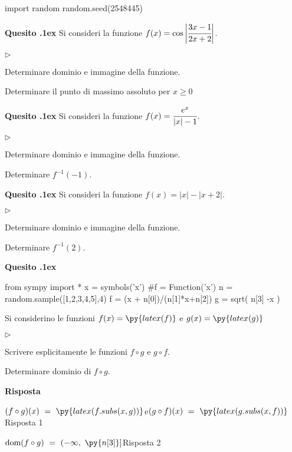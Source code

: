 \documentclass[11pt,twoside,a4paper]{article}
\newcommand{\mylabel}[1]{#1\hfill}
\renewenvironment{itemize}
  {\begin{list}{$\triangleright$}{%
   \setlength{\parskip}{0mm}
   \setlength{\topsep}{.4\baselineskip}
   \setlength{\rightmargin}{0mm}
   \setlength{\listparindent}{0mm}
   \setlength{\itemindent}{0mm}
   \setlength{\labelwidth}{2ex}
   \setlength{\itemsep}{.4\baselineskip}
   \setlength{\parsep}{0mm}
   \setlength{\partopsep}{0mm}
   \setlength{\labelsep}{1ex}
   \setlength{\leftmargin}{\labelwidth+\labelsep}
   \let\makelabel\mylabel}}{%
   \end{list}\vspace*{-1.3mm}}
\newcounter{quesito}
\newenvironment{question}{\bigskip\addtocounter{quesito}{1}\bigskip\bigskip\par\textbf{Quesito \thequesito.\kern1ex}}{\vspace{\parskip}}
\newenvironment{answer}{\par\textbf{Risposta\quad}}{\vspace{\parskip}}
\begin{document}
\begin{pycode}
import random
random.seed(2548445)
\end{pycode}

\begin{question}
Si consideri la funzione $f(x) = \cos \bigg|\cfrac{3x-1}{2x+2} \bigg|$.
\begin{itemize}
\item[1.] Determinare dominio e immagine della funzione.
\item[2.] Determinare il punto di massimo assoluto per $x \geq 0$
\end{itemize}
\end{question}

\begin{question}
Si consideri la funzione $f(x) = \cfrac{e^x}{\lvert x \rvert - 1}$.
\begin{itemize}
\item[1.] Determinare dominio e immagine della funzione.
\item[2.] Determinare $f^{-1}(-1)$.
\end{itemize}
\end{question}

\begin{question}
Si consideri la funzione $f(x) = \lvert x \rvert - \lvert x + 2 \rvert$.
\begin{itemize}
\item[1.] Determinare dominio e immagine della funzione.
\item[2.] Determinare $f^{-1}(2)$.
\end{itemize}
\end{question}

\begin{question}
\def\dom{{\rm dom}}
\def\range{{\rm im}}
\begin{pycode}
from sympy import *
x = symbols('x')
#f = Function('x')
n = random.sample([1,2,3,4,5],4)
f = (x + n[0])/(n[1]*x+n[2])
g = sqrt( n[3] -x )
\end{pycode}
Si considerino le funzioni $\displaystyle f(x) = \py{latex(f)}$ e $\displaystyle g(x) =\py{latex(g)}$
\begin{itemize}
\item[1.] Scrivere esplicitamente le funzioni $f \circ g$ e $g \circ f$.
\item[2.] Determinare dominio di $f \circ g$.
\end{itemize}
\begin{answer}

{\color{blue}$\displaystyle (f \circ g) (x)\ =\ \py{latex(f.subs(x,g))}$\qquad e\qquad $\displaystyle (g \circ f) (x)\ =\ \py{latex(g.subs(x,f))}$\hfill Risposta 1}

\smallskip
{\color{blue}$\dom (f \circ g)\ =\ (-\infty,\ \py{n[3]}]$\hfill Risposta 2}

\end{answer}
\end{question}
\end{document}
